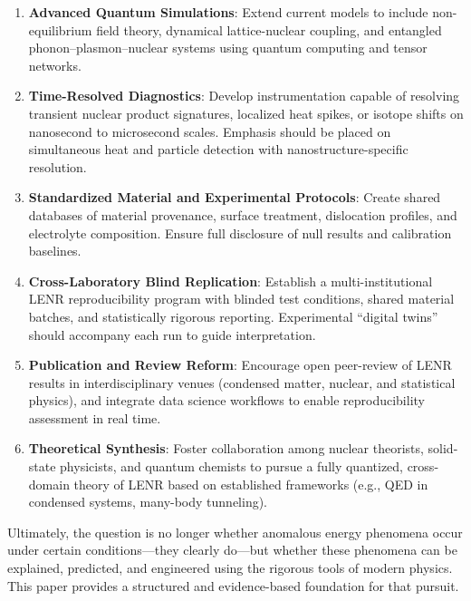     \begin{enumerate}
        \item \textbf{Advanced Quantum Simulations}: Extend current models to include non-equilibrium field theory, dynamical lattice-nuclear coupling, and entangled phonon–plasmon–nuclear systems using quantum computing and tensor networks.
    
        \item \textbf{Time-Resolved Diagnostics}: Develop instrumentation capable of resolving transient nuclear product signatures, localized heat spikes, or isotope shifts on nanosecond to microsecond scales. Emphasis should be placed on simultaneous heat and particle detection with nanostructure-specific resolution.
    
        \item \textbf{Standardized Material and Experimental Protocols}: Create shared databases of material provenance, surface treatment, dislocation profiles, and electrolyte composition. Ensure full disclosure of null results and calibration baselines.
    
        \item \textbf{Cross-Laboratory Blind Replication}: Establish a multi-institutional LENR reproducibility program with blinded test conditions, shared material batches, and statistically rigorous reporting. Experimental “digital twins” should accompany each run to guide interpretation.
    
        \item \textbf{Publication and Review Reform}: Encourage open peer-review of LENR results in interdisciplinary venues (condensed matter, nuclear, and statistical physics), and integrate data science workflows to enable reproducibility assessment in real time.
    
        \item \textbf{Theoretical Synthesis}: Foster collaboration among nuclear theorists, solid-state physicists, and quantum chemists to pursue a fully quantized, cross-domain theory of LENR based on established frameworks (e.g., QED in condensed systems, many-body tunneling).
    
    \end{enumerate}
    
    Ultimately, the question is no longer whether anomalous energy phenomena occur under certain conditions—they clearly do—but whether these phenomena can be explained, predicted, and engineered using the rigorous tools of modern physics. This paper provides a structured and evidence-based foundation for that pursuit.
    
